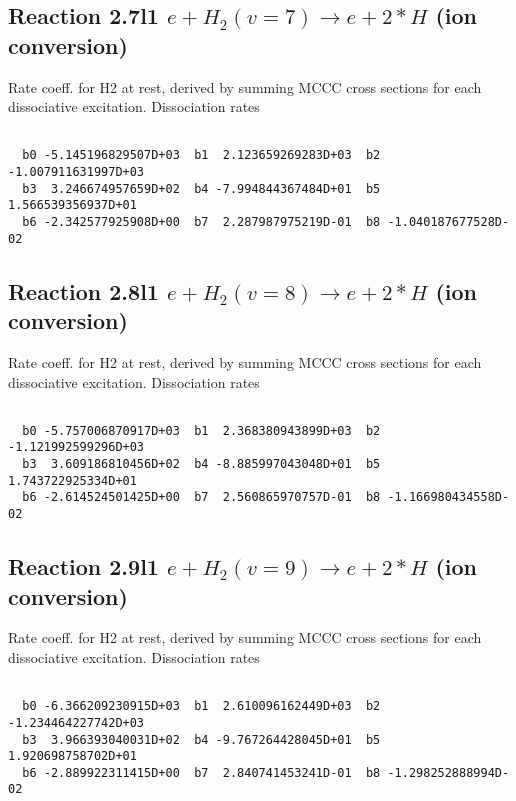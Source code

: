 \newpage
\subsection{
Reaction 2.7l1
$ e + H_2(v=7) \rightarrow e + 2*H $ (ion conversion)
}
Rate coeff. for H2 at rest, derived by summing MCCC cross sections for each dissociative excitation.
Dissociation rates 

\begin{small}\begin{verbatim}

  b0 -5.145196829507D+03  b1  2.123659269283D+03  b2 -1.007911631997D+03
  b3  3.246674957659D+02  b4 -7.994844367484D+01  b5  1.566539356937D+01
  b6 -2.342577925908D+00  b7  2.287987975219D-01  b8 -1.040187677528D-02

\end{verbatim}\end{small}

\newpage
\subsection{
Reaction 2.8l1
$ e + H_2(v=8) \rightarrow e + 2*H $ (ion conversion)
}
Rate coeff. for H2 at rest, derived by summing MCCC cross sections for each dissociative excitation.
Dissociation rates 

\begin{small}\begin{verbatim}

  b0 -5.757006870917D+03  b1  2.368380943899D+03  b2 -1.121992599296D+03
  b3  3.609186810456D+02  b4 -8.885997043048D+01  b5  1.743722925334D+01
  b6 -2.614524501425D+00  b7  2.560865970757D-01  b8 -1.166980434558D-02

\end{verbatim}\end{small}

\newpage
\subsection{
Reaction 2.9l1
$ e + H_2(v=9) \rightarrow e + 2*H $ (ion conversion)
}
Rate coeff. for H2 at rest, derived by summing MCCC cross sections for each dissociative excitation.
Dissociation rates 

\begin{small}\begin{verbatim}

  b0 -6.366209230915D+03  b1  2.610096162449D+03  b2 -1.234464227742D+03
  b3  3.966393040031D+02  b4 -9.767264428045D+01  b5  1.920698758702D+01
  b6 -2.889922311415D+00  b7  2.840741453241D-01  b8 -1.298252888994D-02

\end{verbatim}\end{small}

